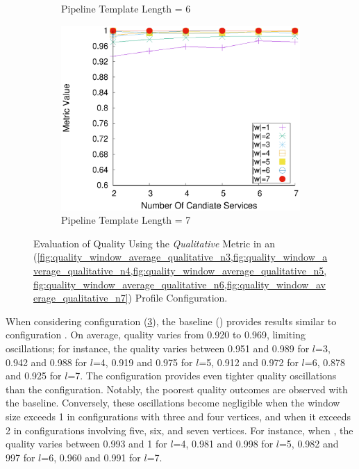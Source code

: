 \begin{figure}[ht!]
\begin{subfigure}{0.49\textwidth}
        \caption{Pipeline Template Length = 6}
        \label{fig:quality_window_average_qualitative_n6}
      \end{subfigure}
      \hfill
      \begin{subfigure}{0.49\textwidth}
        \includegraphics[width=\textwidth]{Images/graphs/window_quality_performance_diff_qual_n7_s7_50_80_n7}
        \caption{Pipeline Template Length = 7}
        \label{fig:quality_window_average_qualitative_n7}
      \end{subfigure}

      \caption{Evaluation of Quality Using the \emph{Qualitative} Metric in an \average (\cref{fig:quality_window_average_qualitative_n3,fig:quality_window_average_qualitative_n4,fig:quality_window_average_qualitative_n5,fig:quality_window_average_qualitative_n6,fig:quality_window_average_qualitative_n7}) Profile Configuration.}
      \label{fig:quality_window_qualitative_average}

    \end{figure}

    When considering configuration \average (\cref{fig:quality_window_qualitative_average}), the baseline () provides results similar to configuration \wide. On average, quality varies from 0.920 to 0.969, limiting oscillations; for instance, the quality varies between 0.951 and 0.989 for $l$=3, 0.942 and 0.988 for $l$=4, 0.919 and 0.975 for $l$=5, 0.912 and 0.972 for $l$=6, 0.878 and 0.925 for $l$=7. The \average configuration provides even tighter quality oscillations than the \wide configuration. Notably, the poorest quality outcomes are observed with the baseline. Conversely, these oscillations become negligible when the window size exceeds 1 in configurations with three and four vertices, and when it exceeds 2 in configurations involving five, six, and seven vertices.  For instance, when , the quality varies between  0.993 and 1 for $l$=4, 0.981 and 0.998 for $l$=5, 0.982 and 997 for $l$=6, 0.960 and 0.991 for $l$=7.



